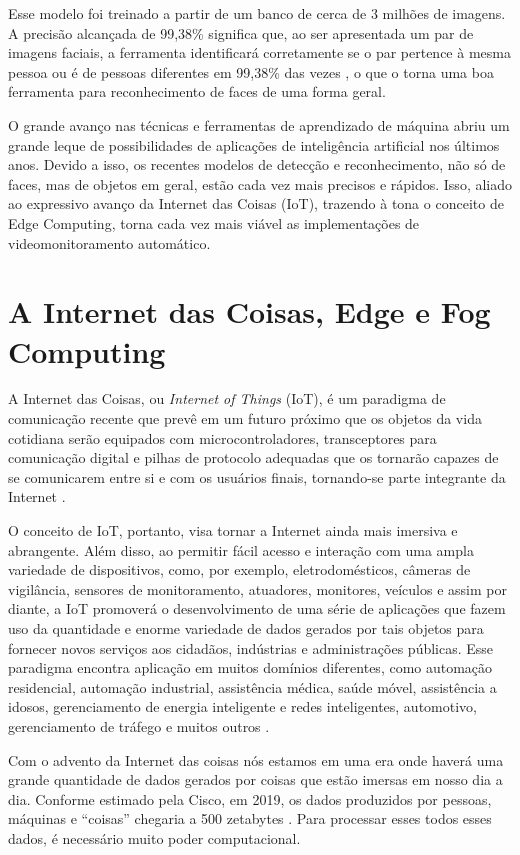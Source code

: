 Esse modelo foi treinado a partir de um banco de cerca de 3 milhões de imagens. A precisão alcançada de 99,38\% significa que, ao ser apresentada um par de imagens faciais, a ferramenta identificará corretamente se o par pertence à mesma pessoa ou é de pessoas diferentes  em 99,38\% das vezes \cite{King2017}, o que o torna uma boa ferramenta para reconhecimento de faces de uma forma geral.

O grande avanço nas técnicas e ferramentas de aprendizado de máquina abriu um grande leque de possibilidades de aplicações de inteligência artificial nos últimos anos. Devido a isso, os recentes modelos de detecção e reconhecimento, não só de faces, mas de objetos em geral, estão cada vez mais precisos e rápidos. Isso, aliado ao expressivo avanço da Internet das Coisas (IoT), trazendo à tona o conceito de Edge Computing, torna cada vez mais viável as implementações de videomonitoramento automático.


\section{A Internet das Coisas, Edge e Fog Computing}

A Internet das Coisas, ou \textit{Internet of Things} (IoT), é um paradigma de comunicação recente que prevê em um futuro próximo que os objetos da vida cotidiana serão equipados com microcontroladores, transceptores para comunicação digital e pilhas de protocolo adequadas que os tornarão capazes de se comunicarem entre si e com os usuários finais, tornando-se parte integrante da Internet \cite{Atzori2010}.

O conceito de IoT, portanto, visa tornar a Internet ainda mais imersiva e abrangente. Além disso, ao permitir fácil acesso e interação com uma ampla variedade de dispositivos, como, por exemplo, eletrodomésticos, câmeras de vigilância, sensores de monitoramento, atuadores, monitores, veículos e assim por diante, a IoT promoverá o desenvolvimento de uma série de aplicações que fazem uso da quantidade e enorme variedade de dados gerados por tais objetos para fornecer novos serviços aos cidadãos, indústrias e administrações públicas. Esse paradigma encontra aplicação em muitos domínios diferentes, como automação residencial, automação industrial, assistência médica, saúde móvel, assistência a idosos, gerenciamento de energia inteligente e redes inteligentes, automotivo, gerenciamento de tráfego e muitos outros \cite{Bellavista2013}.

Com o advento da Internet das coisas nós estamos em uma era onde haverá uma grande quantidade de dados gerados por coisas que estão imersas em nosso dia a dia. Conforme estimado pela Cisco, em 2019, os dados produzidos por pessoas, máquinas e “coisas” chegaria a 500 zetabytes \cite{Deutscher2015}. Para processar esses todos esses dados, é necessário muito poder computacional.

